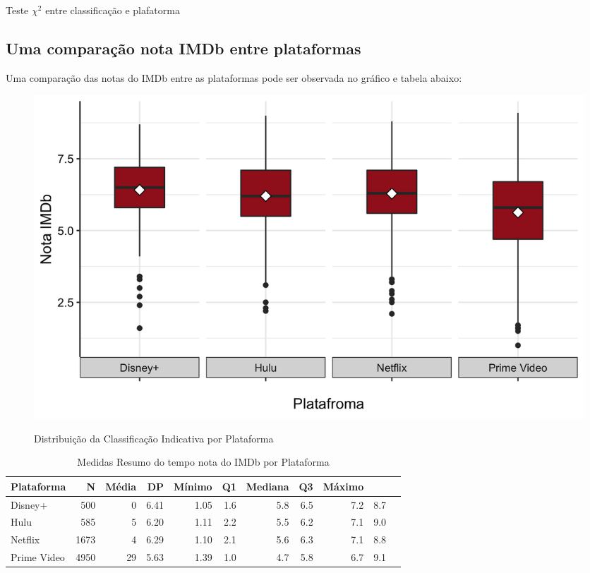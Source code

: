 \documentclass[a4paper, 12pt]{article} %
\begin{document}
\begin{quadro}[H]
\centering
\caption{Teste $\chi^2$ entre classificação e plafatorma }
\label{R-Q-Teste-1}
\vspace{0.1cm}
\end{quadro}


\subsection {Uma comparação nota IMDb entre plataformas}
Uma comparação das notas do IMDb entre as plataformas pode ser observada no gráfico e tabela abaixo:

\begin{figure}[H]
    \centering
    \caption{Distribuição da Classificação Indicativa por Plataforma}
    \includegraphics[scale=0.25]{Fig_IMDb_Plataforma.png}
    \label{fig:my_label}
\end{figure}

\begin{table}[H]
\caption{Medidas Resumo do tempo nota do IMDb por Plataforma}
\centering
\begin{tabular}{l|rrrrrrrrrr}
\hline
\multicolumn{1}{l|}{\textbf{Plataforma}} &
\multicolumn{1}{r}{\textbf{N}} &
\multicolumn{1}{r}{\textbf{Média}} &
\multicolumn{1}{r}{\textbf{DP}}&
\multicolumn{1}{r}{\textbf{Mínimo}}&
\multicolumn{1}{r}{\textbf{Q1}}&
\multicolumn{1}{r}{\textbf{Mediana}}&
\multicolumn{1}{r}{\textbf{Q3}}&
\multicolumn{1}{r}{\textbf{Máximo}}\\
\hline

Disney+ &  500 & 0 &  6.41 & 1.05 &  1.6 & 5.8 & 6.5 & 7.2 & 8.7 \\
Hulu & 585 & 5 &  6.20 & 1.11 & 2.2 & 5.5 & 6.2 & 7.1 & 9.0  \\
Netflix &  1673 & 4 &  6.29 & 1.10 &  2.1 & 5.6 & 6.3 & 7.1 & 8.8  \\
Prime Video &  4950 & 29 & 5.63 & 1.39 & 1.0 & 4.7 & 5.8 & 6.7 & 9.1  \\
\hline
\end{tabular}
\end{table}
\end{document}
